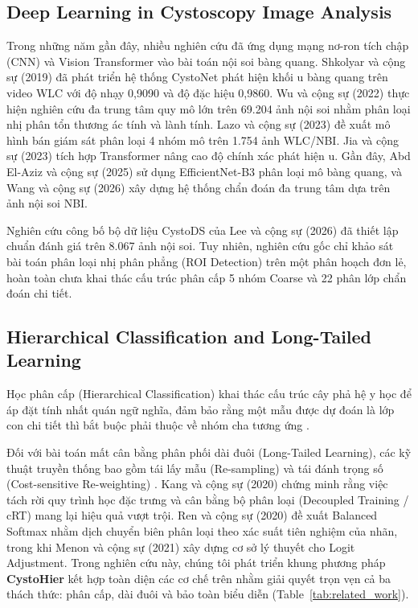 \documentclass[runningheads]{llncs}
\begin{document}
\subsection{Deep Learning in Cystoscopy Image Analysis}
Trong những năm gần đây, nhiều nghiên cứu đã ứng dụng mạng nơ-ron tích chập (CNN) và Vision Transformer vào bài toán nội soi bàng quang. Shkolyar và cộng sự (2019) \cite{ref_shkolyar2019augmented} đã phát triển hệ thống CystoNet phát hiện khối u bàng quang trên video WLC với độ nhạy 0,9090 và độ đặc hiệu 0,9860. Wu và cộng sự (2022) \cite{ref_wu2022multicenter} thực hiện nghiên cứu đa trung tâm quy mô lớn trên 69.204 ảnh nội soi nhằm phân loại nhị phân tổn thương ác tính và lành tính. Lazo và cộng sự (2023) \cite{ref_lazo2023semisupervised} đề xuất mô hình bán giám sát phân loại 4 nhóm mô trên 1.754 ảnh WLC/NBI. Jia và cộng sự (2023) \cite{ref_jia2023transformer} tích hợp Transformer nâng cao độ chính xác phát hiện u. Gần đây, Abd El-Aziz và cộng sự (2025) \cite{ref_abdelaziz2025efficientnet} sử dụng EfficientNet-B3 phân loại mô bàng quang, và Wang và cộng sự (2026) \cite{ref_wang2026narrowband} xây dựng hệ thống chẩn đoán đa trung tâm dựa trên ảnh nội soi NBI.

Nghiên cứu công bố bộ dữ liệu CystoDS của Lee và cộng sự (2026) \cite{ref_lee2026cystods} đã thiết lập chuẩn đánh giá trên 8.067 ảnh nội soi. Tuy nhiên, nghiên cứu gốc chỉ khảo sát bài toán phân loại nhị phân phẳng (ROI Detection) trên một phân hoạch đơn lẻ, hoàn toàn chưa khai thác cấu trúc phân cấp 5 nhóm Coarse và 22 phân lớp chẩn đoán chi tiết.

\subsection{Hierarchical Classification and Long-Tailed Learning}
Học phân cấp (Hierarchical Classification) khai thác cấu trúc cây phả hệ y học để áp đặt tính nhất quán ngữ nghĩa, đảm bảo rằng một mẫu được dự đoán là lớp con chi tiết thì bắt buộc phải thuộc về nhóm cha tương ứng \cite{ref_lazo2023semisupervised}. 

Đối với bài toán mất cân bằng phân phối dài đuôi (Long-Tailed Learning), các kỹ thuật truyền thống bao gồm tái lấy mẫu (Re-sampling) và tái đánh trọng số (Cost-sensitive Re-weighting) \cite{ref_ren2020balanced}. Kang và cộng sự (2020) \cite{ref_kang2020decoupling} chứng minh rằng việc tách rời quy trình học đặc trưng và cân bằng bộ phân loại (Decoupled Training / cRT) mang lại hiệu quả vượt trội. Ren và cộng sự (2020) \cite{ref_ren2020balanced} đề xuất Balanced Softmax nhằm dịch chuyển biên phân loại theo xác suất tiên nghiệm của nhãn, trong khi Menon và cộng sự (2021) \cite{ref_menon2021logit} xây dựng cơ sở lý thuyết cho Logit Adjustment. Trong nghiên cứu này, chúng tôi phát triển khung phương pháp \textbf{CystoHier} kết hợp toàn diện các cơ chế trên nhằm giải quyết trọn vẹn cả ba thách thức: phân cấp, dài đuôi và bảo toàn biểu diễn (Table~\ref{tab:related_work}).
\end{document}
